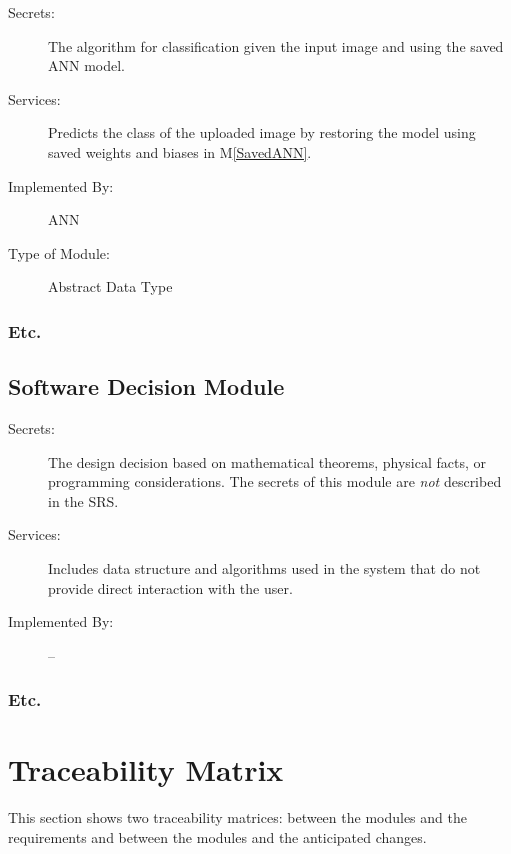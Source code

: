 \documentclass[12pt, titlepage]{article}
\newcommand{\mref}[1]{M\ref{#1}}
\begin{document}
  \begin{description}
    \item[Secrets:]The algorithm for classification given the input image and using the 
    saved ANN model.
    \item[Services:]Predicts the class of the uploaded image by restoring the model using saved 
    weights and biases in \mref{SavedANN}.
    \item[Implemented By:] ANN
    \item[Type of Module:] Abstract Data Type
    \end{description}


\subsubsection{Etc.}


\subsection{Software Decision Module}

\begin{description}
\item[Secrets:] The design decision based on mathematical theorems, physical
  facts, or programming considerations. The secrets of this module are
  \emph{not} described in the SRS.
\item[Services:] Includes data structure and algorithms used in the system that
  do not provide direct interaction with the user. 
\item[Implemented By:] --
\end{description}

\subsubsection{Etc.}

\section{Traceability Matrix} \label{SecTM}

This section shows two traceability matrices: between the modules and the
requirements and between the modules and the anticipated changes.
\end{document}
